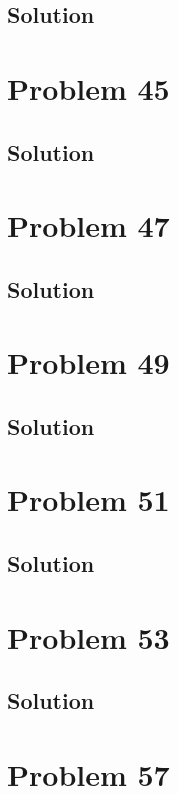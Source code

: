 \documentclass[12pt]{article}
\begin{document}
        \subsection{Solution}

    \pagebreak
    \section{Problem 45}

    \subsection{Solution}

    \pagebreak
    \section{Problem 47}

    \subsection{Solution}

    \pagebreak
    \section{Problem 49}

    \subsection{Solution}

    \pagebreak
    \section{Problem 51}

    \subsection{Solution}

    \pagebreak
    \section{Problem 53}

    \subsection{Solution}

    \pagebreak
    \section{Problem 57}
\end{document}
